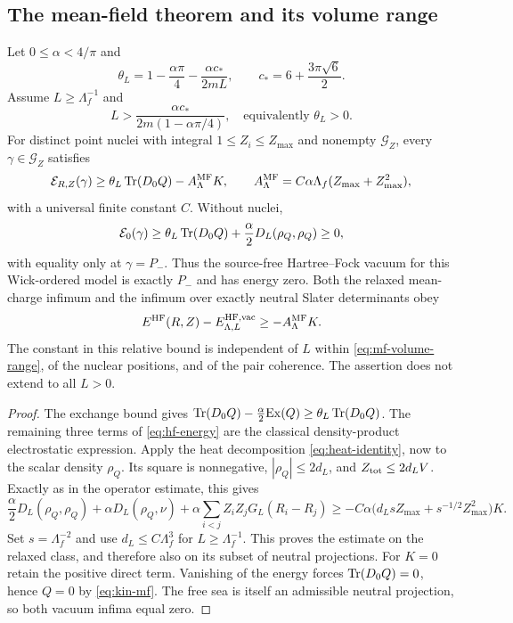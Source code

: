 \subsection{The mean-field theorem and its volume range}

\begin{theorem}
\label{thm:mf}
Let $0\le\alpha<4/\pi$ and
\[
 \theta_L=1-\frac{\alpha\pi}4-\frac{\alpha c_*}{2mL},
 \qquad c_*=6+\frac{3\pi\sqrt6}{2}.
\]
Assume $L\ge\Lambda_f^{-1}$ and
\begin{equation}
 L>\frac{\alpha c_*}{2m(1-\alpha\pi/4)},
 \quad\text{equivalently }\theta_L>0.
 \label{eq:mf-volume-range}
\end{equation}
For distinct point nuclei with integral $1\le Z_i\le Z_{\max}$ and nonempty
$\mathcal G_Z$, every $\gamma\in\mathcal G_Z$ satisfies
\begin{equation}
 \mathcal E_{R,Z}(\gamma)
 \ge\theta_L\operatorname{Tr}(D_0Q)-A^{\rm MF}_\Lambda K,
 \qquad
 A^{\rm MF}_\Lambda=C\alpha\Lambda_f(Z_{\max}+Z_{\max}^2),
 \label{eq:mf-bound}
\end{equation}
with a universal finite constant $C$.  Without nuclei,
\[
 \mathcal E_0(\gamma)
 \ge\theta_L\operatorname{Tr}(D_0Q)+\frac\alpha2D_L(\rho_Q,\rho_Q)\ge0,
\]
with equality only at $\gamma=P_-$.  Thus the source-free Hartree--Fock
vacuum for this Wick-ordered model is exactly $P_-$ and has energy zero.
Both the relaxed mean-charge infimum and the infimum over exactly neutral
Slater determinants obey
\begin{equation}
 E^{\rm HF}(R,Z)-E^{\rm HF,\mathrm{vac}}_{\Lambda,L}
 \ge-A^{\rm MF}_\Lambda K.
 \label{eq:mf-relative}
\end{equation}
The constant in this relative bound is independent of $L$ within
\eqref{eq:mf-volume-range}, of the nuclear positions, and of the pair
coherence.  The assertion does not extend to all $L>0$.
\end{theorem}
\begin{proof}
The exchange bound gives
$\operatorname{Tr}(D_0Q)-\frac\alpha2\mathrm{Ex}(Q)\ge\theta_L\operatorname{Tr}(D_0Q)$.
The remaining three terms of \eqref{eq:hf-energy} are the classical
density-product electrostatic expression.  Apply the heat decomposition
\eqref{eq:heat-identity}, now to the scalar density $\rho_Q$.
Its square is nonnegative, $|\rho_Q|\le2d_L$, and
$Z_{\rm tot}\le2d_LV$.  Exactly as in the operator estimate, this gives
\[
 \frac\alpha2D_L(\rho_Q,\rho_Q)+\alpha D_L(\rho_Q,\nu)
   +\alpha\sum_{i<j}Z_iZ_jG_L(R_i-R_j)
 \ge-C\alpha\bigl(d_Ls Z_{\max}+s^{-1/2}Z_{\max}^2\bigr)K.
\]
Set $s=\Lambda_f^{-2}$ and use $d_L\le C\Lambda_f^3$ for
$L\ge\Lambda_f^{-1}$.  This proves the estimate on the relaxed class,
and therefore also on its subset of neutral projections.
For $K=0$ retain the positive direct term.  Vanishing of the energy forces
$\operatorname{Tr}(D_0Q)=0$, hence $Q=0$ by \eqref{eq:kin-mf}.  The free sea is itself
an admissible neutral projection, so both vacuum infima equal zero.
\end{proof}

